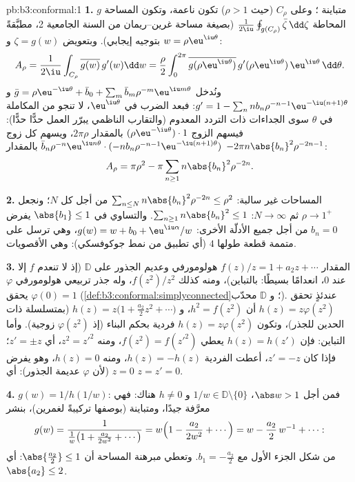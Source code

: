 \begin{solution}{pb:b3:conformal:1}
\textbf{1.} $g$ متباينة ؛ وعلى $C_\rho$ (حيث
$\rho > 1$) تكون ناعمة، وتكون المساحة المحاطة $\frac1{2\iu}\oint_{g(C_\rho)}\bar\zeta\,\dd\zeta$ (بصيغة
مساحة غرين--ريمان من السنة الجامعية 2، مطبَّقةً بتوجيه إيجابي).
وبتعويض $\zeta = g(w)$ و $w =
\rho\eu^{\iu\theta}$:
\[
A_\rho = \frac1{2\iu}\int_{C_\rho}\overline{g(w)}\,g'(w)\dd
w = \frac\rho2\int_0^{2\pi}\overline{g(\rho\eu^{\iu\theta})}
\,g'(\rho\eu^{\iu\theta})\,\eu^{\iu\theta}\,\dd\theta .
\]
ونُدخل $\bar g = \rho\eu^{-\iu\theta} + \bar b_0 +
\sum_m\bar b_m\rho^{-m}\eu^{\iu m\theta}$ و $g' = 1 -
\sum_nnb_n\rho^{-n-1}\eu^{-\iu(n+1)\theta}$: فبعد الضرب في $\eu^{\iu\theta}$، لا تنجو من
المكاملة في $\theta$ سوى الجداءات ذات التردد المعدوم (والتقارب
الناظمي يبرّر العمل حدًّا حدًّا): فيسهم الزوج $(\rho\eu^{-\iu\theta})\cdot1$ بالمقدار
$2\pi\rho$، ويسهم كل زوج $\bar b_n\rho^{-n}\eu^{\iu
n\theta}\cdot(-nb_n\rho^{-n-1}\eu^{-\iu(n+1)\theta})$ بالمقدار $-2\pi n\abs{b_n}^2\rho^{-2n-1}$:
\[
A_\rho = \pi\rho^2 - \pi\sum_{n\geq1}n\abs{b_n}^2\rho^{-2n}.
\]

\textbf{2.} المساحات غير سالبة: $\sum_{n\leq
N}n\abs{b_n}^2\rho^{-2n} \leq \rho^2$ من أجل كل $N$؛ ونجعل
$\rho \to 1^+$ ثم $N \to \infty$: $\sum_{n\geq1}n\abs{b_n}^2 \leq 1$. والتساوي في $\abs{b_1}
\leq 1$
يفرض $b_n = 0$ من أجل جميع الأدلّة الأخرى: $g(w) = w + b_0 +
\eu^{\iu\alpha}/w$، وهي ترسل على متممة
قطعة طولها $4$ (أي تطبيق من نمط جوكوفسكي): وهي الأقصويات.

\textbf{3.} المقدار $f(z)/z = 1 + a_2z + \cdots$ هولومورفي وعديم الجذور على
$\mathbb D$ (إذ لا تنعدم $f$ إلا عند $0$، انعدامًا بسيطًا:
بالتباين)، ومنه كذلك $f(z^2)/z^2$، وله جذر تربيعي هولومورفي
$\varphi$ يحقق $\varphi(0) = 1$ (\cref{def:b3:conformal:simplyconnected}؛ و $\mathbb D$
محدّب). عندئذٍ تحقق $h(z) = z\varphi(z^2)$ أن $h^2 =
f(z^2)$، و $h(z) = z\bigl(1 + \frac{a_2}2z^2 + \cdots\bigr)$ (بمتسلسلة
ذات الحدين للجذر)، وتكون $h(z) = z\varphi(z^2)$ فردية بحكم البناء (إذ
$\varphi(z^2)$ زوجية). وأما التباين: فإن $h(z) = h(z')$ يعطي
$f(z^2) =
f(z'^2)$، ومنه $z^2 = z'^2$، أي $z' = \pm z$؛ فإذا كان
$z' = -z$، أعطت الفردية $h(z) = -h(z)$، ومنه $h(z) = 0$، وهو
يفرض $z
= 0$ (لأن $\varphi$ عديمة الجذور): أي $z = z' = 0$.

\textbf{4.} $g(w) = 1/h(1/w)$: فمن أجل $\abs w > 1$، $1/w \in
\mathbb D\setminus\{0\}$ و
$h \neq 0$ هناك: فهي معرَّفة جيدًا، ومتباينة (بوصفها تركيبةً
لغمرين)، بنشر
\[
g(w) = \frac{1}{\frac1w\bigl(1 + \frac{a_2}{2w^2} +
\cdots\bigr)} = w\Bigl(1 - \frac{a_2}{2w^2} + \cdots\Bigr)
= w - \frac{a_2}{2}\,w^{-1} + \cdots :
\]
من شكل الجزء الأول مع $b_1 = -\frac{a_2}2$. وتعطي مبرهنة المساحة أن $\abs{\frac{a_2}2} \leq 1$:
أي $\abs{a_2} \leq 2$.


\end{solution}
